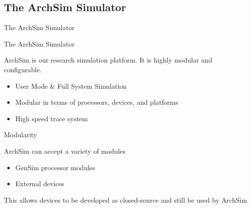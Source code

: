 \subsection{The ArchSim Simulator}

\begin{frame}{The ArchSim Simulator}

\end{frame}

\begin{frame}{The ArchSim Simulator}

ArchSim is our research simulation platform. It is highly modular and configurable.

\begin{itemize}
	\item User Mode \& Full System Simulation
	\item Modular in terms of processors, devices, and platforms
	\item High speed trace system
\end{itemize}

\end{frame}




\begin{frame}{Modularity}

ArchSim can accept a variety of modules
\begin{itemize}
	\item GenSim processor modules
	\item External devices
\end{itemize}

This allows devices to be developed as closed-source and still be used
by ArchSim


\end{frame}

